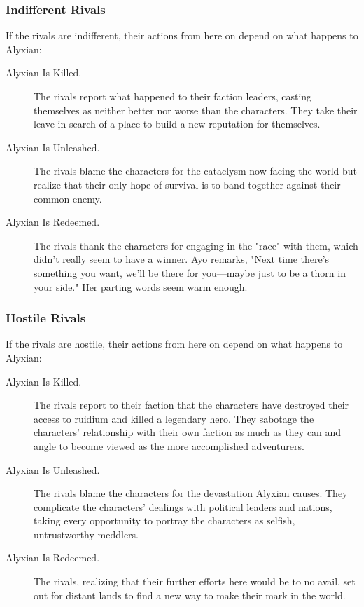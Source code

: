 \documentclass[letterpaper, 11pt, bg=full, twocolumn]{dndbook}
\begin{document}
\subsubsection{Indifferent Rivals}

If the rivals are indifferent, their actions from here on depend on what happens to Alyxian:

\begin{description}
\item[Alyxian Is Killed.] The rivals report what happened to their faction leaders, casting themselves as neither better nor worse than the characters. They take their leave in search of a place to build a new reputation for themselves.
\item[Alyxian Is Unleashed.] The rivals blame the characters for the cataclysm now facing the world but realize that their only hope of survival is to band together against their common enemy.
\item[Alyxian Is Redeemed.] The rivals thank the characters for engaging in the "race" with them, which didn't really seem to have a winner. Ayo remarks, "Next time there's something you want, we'll be there for you---maybe just to be a thorn in your side." Her parting words seem warm enough.
\end{description}

\subsubsection{Hostile Rivals}

If the rivals are hostile, their actions from here on depend on what happens to Alyxian:

\begin{description}
\item[Alyxian Is Killed.] The rivals report to their faction that the characters have destroyed their access to ruidium and killed a legendary hero. They sabotage the characters' relationship with their own faction as much as they can and angle to become viewed as the more accomplished adventurers.
\item[Alyxian Is Unleashed.] The rivals blame the characters for the devastation Alyxian causes. They complicate the characters' dealings with political leaders and nations, taking every opportunity to portray the characters as selfish, untrustworthy meddlers.
\item[Alyxian Is Redeemed.] The rivals, realizing that their further efforts here would be to no avail, set out for distant lands to find a new way to make their mark in the world.
\end{description}
\end{document}
